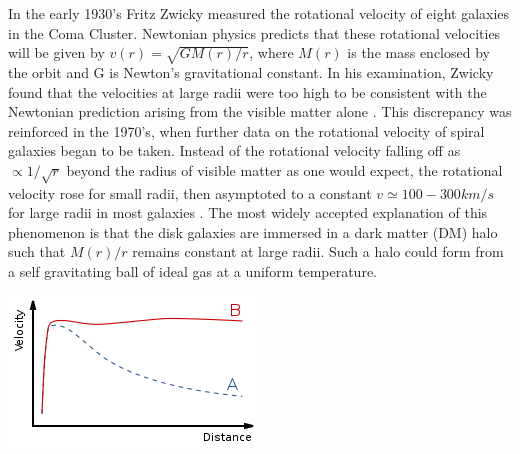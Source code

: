 \documentclass[a4paper,12pt]{article}
\begin{document}
In the early 1930's Fritz Zwicky measured the rotational velocity of eight galaxies in the Coma Cluster.  Newtonian physics predicts that these rotational velocities will be given by $v(r)=\sqrt{GM(r)/r}$, where $M(r)$ is the mass enclosed by the orbit and G is Newton's gravitational constant.  In his examination, Zwicky found that the velocities at large radii were too high to be consistent with the Newtonian prediction arising from the visible matter alone \cite{Zwicky}. This discrepancy was reinforced in the 1970's, when further data on the rotational velocity of spiral galaxies began to be taken.  Instead of the rotational velocity falling off as $\propto 1/\sqrt{r}$ beyond the radius of visible matter as one would expect, the rotational velocity rose for small radii, then asymptoted to a constant $ v \simeq 100-300 km/s $ for large radii in most galaxies \cite{Persic,Battaner,Binney}.  The most widely accepted explanation of this phenomenon is that the disk galaxies are immersed in a dark matter (DM) halo such that $ M(r)/r $ remains constant at large radii.  Such a halo could form from a self gravitating ball of ideal gas at a uniform temperature.

\begin{center}
\includegraphics[scale=1]{RotationCurve.png}
\end{center}
\end{document}

